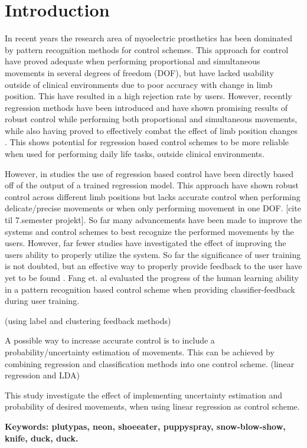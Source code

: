 
\section{Introduction}			%


In recent years the research area of myoelectric prosthetics has been dominated by pattern recognition methods for control schemes. This approach for control have proved adequate when performing proportional and simultaneous movements in several degrees of freedom (DOF), but have lacked usability outside of clinical environments due to poor accuracy with change in limb position. This have resulted in a high rejection rate by users. 
However, recently regression methods have been introduced and have shown promising results of robust control while performing both proportional and simultaneous movements, while also having proved to effectively combat the effect of limb position changes \cite{Hwang2017, Hanhe2014}. This shows potential for regression based control schemes to be more reliable when used for performing daily life tasks, outside clinical environments.

However, in studies the use of regression based control have been directly based off of the output of a trained regression model. This approach have shown robust control across different limb positions but lacks accurate control when performing delicate/precise movements or when only performing movement in one DOF. [cite til 7.semester projekt]. So far many advancements have been made to improve the systems and control schemes to best recognize the performed movements by the users. However, far fewer studies have investigated the effect of improving the users ability to properly utilize the system. So far the significance of user training is not doubted, but an effective way to properly provide feedback to the user have yet to be found \cite{Fang2017}. Fang et. al \cite{Fang2017} evaluated the progress of the human learning ability in a pattern recognition based control scheme when providing classifier-feedback during user training. 

(using label and clustering feedback methods) 




A possible way to increase accurate control is to include a probability/uncertainty estimation of movements. This can be achieved by combining regression and classification methods into one control scheme. (linear regression and LDA)

This study investigate the effect of implementing uncertainty estimation and probability of desired movements, when using linear regression as control scheme. 


\textbf{Keywords: plutypas, neon, shoeeater, puppyspray, snow-blow-show, knife, duck, duck.}